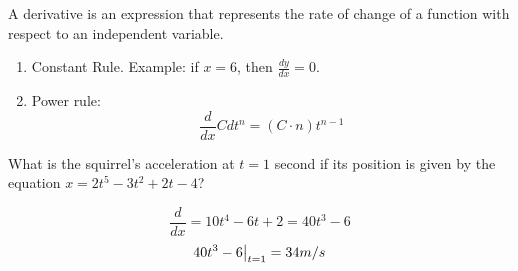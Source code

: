 \begin{remark}
	A derivative is an expression that represents the rate of change of a function
	with respect to an independent variable.

	\begin{enumerate}
		\item Constant Rule. Example: if $x=6$, then $\frac{dy}{dx}=0$.
		\item Power rule: $$\frac{d}{dx}Cdt^n = (C \cdot n)t^{n-1}$$
	\end{enumerate}
\end{remark}

\begin{example}[Example]
	What is the squirrel's acceleration at $t=1$ second if its position is
	given by the equation $x = 2t^5 - 3t^2 + 2t - 4$?

	$$\frac{d}{dx} = 10t^4 - 6t + 2 = 40t^3 - 6$$
	$$\evalat{40t^3 - 6}{t = 1} = 34 m / s$$
\end{example}



